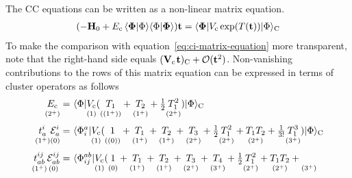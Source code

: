 \documentclass[11pt]{article}
\numberwithin{equation}{section}
\begin{document}
\begin{rmk}
\label{rmk:cc-perturbative-analysis}
The CC equations can be written as a non-linear matrix equation.
\begin{align}
\label{eq:cc-matrix-equation}
(
-
  \bo{H}_0
+
  E_\mr{c}\,
  \ip{\bm{\F}|\F}
  \ip{\F|\bm{\F}}
)
  \bo{t}
=
  \ip{\bm{\F}|
    V_\mr{c}\,
    \mr{exp}(T(\bo{t}))
  |\F}_\mr{C}
\end{align}
To make the comparison with equation~\ref{eq:ci-matrix-equation} more transparent, note that the right-hand side equals
$
  (
    \mathbf{V}_{\mathrm{c}}\hspace{0.8pt}
    \mathbf{t}
  )_{\mathrm{C}}
+
  \mathcal{O}(\mathbf{t}^2)
$.
Non-vanishing contributions to the rows of this matrix equation can be expressed in terms of cluster operators as follows
\begin{align}
\label{eq:cc-reference-equation}
  \underset{(2^+)}{\vphantom{(}
  E_{\mathrm{c}}
  }
=&\
  \langle\Phi |
  \underset{(1)}{\vphantom{(}
    V_{\mathrm{c}}
  }
    (
    \underset{((1^{+}))}{\vphantom{(}
      T_1
    }
    +
    \underset{(1^{+})}{\vphantom{(}
      T_2
    }
    +
      \tfrac{1}{2}
    \underset{(2^{+})}{\vphantom{(}
      T_1^2
    }
    )
  |\Phi \rangle_{\mathrm{C}}
\\[3pt]
  \underset{(1^+)}{\vphantom{(}
  t_a^i
  }
  \underset{(0)}{\vphantom{(}
  \mathcal{E}_a^i
  }
=&\
  \langle\Phi _i^a|
  \underset{(1)}{\vphantom{(}
    V_{\mathrm{c}}
  }
    (
    \underset{((0))}{\vphantom{(}
      1
    }
    +
    \underset{(1^{+})}{\vphantom{(}
      T_1
    }
    +
    \underset{(1^{+})}{\vphantom{(}
      T_2
    }
    +
    \underset{(2^{+})}{\vphantom{(}
      T_3
    }
    +
      \tfrac{1}{2}
    \underset{(2^{+})}{\vphantom{(}
      T_1^2
    }
    +
    \underset{(2^{+})}{\vphantom{(}
      T_1T_2
    }
    +
      \tfrac{1}{3!}
    \underset{(3^{+})}{\vphantom{(}
      T_1^3
    }
    )
  |\Phi \rangle_{\mathrm{C}}
\\[3pt]
\nonumber
  \underset{(1^+)}{\vphantom{(}
  t_{ab}^{ij}
  }
  \underset{(0)}{\vphantom{(}
  \mathcal{E}_{ab}^{ij}
  }
=&\
  \langle\Phi _{ij}^{ab}|
  \underset{(1)}{\vphantom{(}
    V_{\mathrm{c}}
  }
    (
    \underset{(0)}{\vphantom{(}
      1
    }
    +
    \underset{(1^{+})}{\vphantom{(}
      T_1
    }
    +
    \underset{(1^{+})}{\vphantom{(}
      T_2
    }
    +
    \underset{(2^{+})}{\vphantom{(}
      T_3
    }
    +
    \underset{(3^{+})}{\vphantom{(}
      T_4
    }
    +
      \tfrac{1}{2}
    \underset{(2^{+})}{\vphantom{(}
      T_1^2
    }
    +
    \underset{(2^{+})}{\vphantom{(}
      T_1T_2
    }
    +
    \underset{(3^{+})}{\vphantom{(}
}
\end{align}
\end{rmk}
\end{document}
